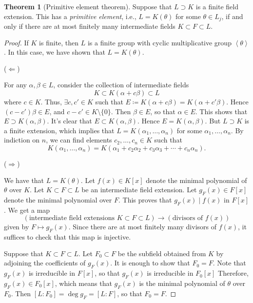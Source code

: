 \documentclass[10pt,letterpaper,cm]{nupset}
\theoremstyle{definition}
\theoremstyle{theorem}
\newtheorem{theorem}[definition]{Theorem}
\theoremstyle{remark}
\newcommand{\1}{\mathbf{1}}
\newcommand{\0}{\vec 0}
\begin{document}
\begin{theorem}[Primitive element theorem]
Suppose that $L \supset K$ is a finite field extension. This has a \textit{primitive element}, i.e.,  $L= K(\theta)$ for some $\theta \in L_j$, if and only if there are at most finitely many intermediate fields $K \subset F \subset L$.
\end{theorem}
\begin{proof}
If $K$ is finite, then $L$ is a finite group with cyclic multiplicative group $\left\langle \theta \right\rangle$. In this case, we have shown  that $L = K(\theta)$.

\medskip


($\Longleftarrow$) 

For any $\alpha, \beta \in L$, consider the collection of intermediate fields $$K \subset K(\alpha + c\beta) \subset L$$ where $c\in K$. Thus,  $ \exists c, c' \in K$ such that $E\coloneqq  K(\alpha + c \beta) = K(\alpha + c' \beta)$. Hence $\left(c - c'\right)\beta \in E$, and $c- c' \in K \setminus \{0\}$. Then $ \beta \in E$, so that $\alpha \in E$. This shows that $E \supset K(\alpha, \beta)$. It's clear that $E \subset K(\alpha, \beta)$. Hence $E = K(\alpha, \beta)$. But $L \supset K$ is a finite extension, which implies that $L = K(\alpha_1, \ldots, \alpha_n)$ for some $\alpha_1, \ldots, \alpha_n$. By indiction on $n$, we can find elements $c_2, \ldots, c_n \in K$ such that $$ K(\alpha_1, \ldots, \alpha_n) = K(\alpha_1 + c_2\alpha_2 + c_3\alpha_3 + \cdots + c_n \alpha_n ) . $$

\medskip


($\Longrightarrow$) 

We have that $L= K(\theta)$. Let $f(x) \in K[x]$ denote the minimal polynomial of $\theta$ over $K$. Let $K \subset F \subset L$ be an intermediate field extension. Let $g_F(x) \in F[x]$ denote the minimal polynomial over $F$. This proves that $g_F(x) \mid f(x)$ in $F[x]$. We get a map $$\left(\text{intermediate field extensions } K \subset F \subset L \right) \to \left(\text{divisors of } f(x)\right)$$ given by $F \mapsto g_F(x)$. Since there are at most finitely many divisors of $f(x)$, it suffices to check that this map is injective. 

\medskip

 Suppose that $K \subset F \subset L$. Let $F_0 \subset F$ be the subfield obtained from $K$ by adjoining the coefficients of $g_F(x)$. It is enough to show that $F_0 = F$. Note that $g_F(x)$ is irreducible in $F[x]$, so that $g_F(x)$ is irreducible in $F_0[x]$ Therefore, $g_F(x) \in F_0[x]$, which means that $g_F(x)$ is the minimal polynomial of $\theta$ over $F_0$. Then $[L: F_0] = \deg{g_F} = [L: F]$, so that $F_0 = F$. 
\end{proof}
\end{document}
